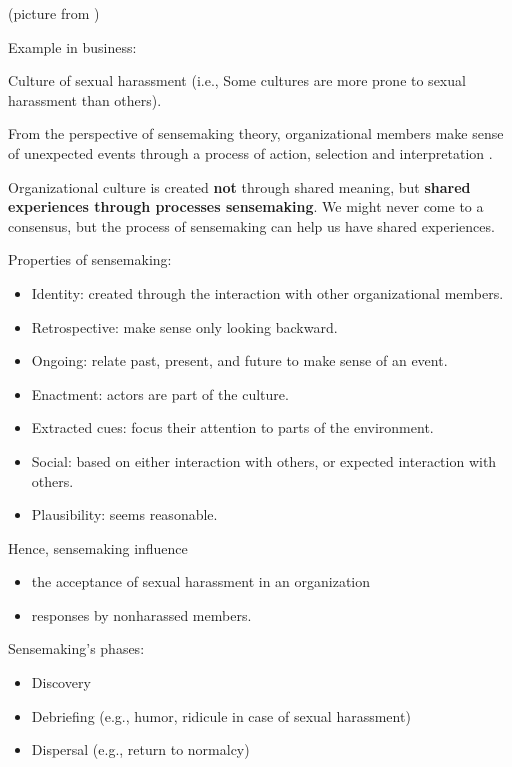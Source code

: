 \documentclass[
]{book}
\providecommand{\tightlist}{%
  \setlength{\itemsep}{0pt}\setlength{\parskip}{0pt}}
\begin{document}
(picture from \citep{Lu_2017})

Example in business: \citep{KennethWm_2014}

\citep{Dougherty_2004}

Culture of sexual harassment (i.e., Some cultures are more prone to sexual harassment than others).

From the perspective of sensemaking theory, organizational members make sense of unexpected events through a process of
action, selection and interpretation \citep{Weick_1995}.

Organizational culture is created \textbf{not} through shared meaning, but \textbf{shared experiences through processes
sensemaking}. We might never come to a consensus, but the process of sensemaking can help us have shared experiences.

Properties of sensemaking:

\begin{itemize}
\tightlist
\item
  Identity: created through the interaction with other organizational members.
\item
  Retrospective: make sense only looking backward.
\item
  Ongoing: relate past, present, and future to make sense of an event.
\item
  Enactment: actors are part of the culture.
\item
  Extracted cues: focus their attention to parts of the environment.
\item
  Social: based on either interaction with others, or expected interaction with others.
\item
  Plausibility: seems reasonable.
\end{itemize}

Hence, sensemaking influence

\begin{itemize}
\tightlist
\item
  the acceptance of sexual harassment in an organization
\item
  responses by nonharassed members.
\end{itemize}

Sensemaking's phases:

\begin{itemize}
\tightlist
\item
  Discovery
\item
  Debriefing (e.g., humor, ridicule in case of sexual harassment)
\item
  Dispersal (e.g., return to normalcy)
\end{itemize}
\end{document}
